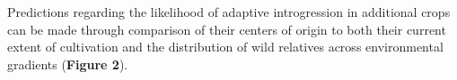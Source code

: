 \documentclass[11pt]{article}
\begin{document}
\begin{enumerate}

























	\end{enumerate}
	Predictions regarding the likelihood of adaptive introgression in additional crops can be made through comparison of their centers of origin to both their current extent of cultivation and the distribution of wild relatives across environmental gradients (\textbf{Figure 2}).
	
\end{document}
